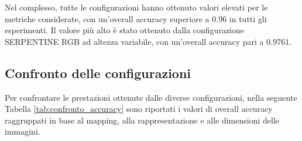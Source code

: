 \begin{table}[H]
    \centering
    \caption{Metriche delle configurazioni ad altezza variabile}
    \label{tab:metriche_variable}
    \renewcommand{\arraystretch}{1.3}
\end{table}

Nel complesso, tutte le configurazioni hanno ottenuto valori elevati
per le metriche considerate, con un'overall accuracy superiore a
0.96 in tutti gli esperimenti. Il valore più alto è stato ottenuto
dalla configurazione SERPENTINE RGB ad altezza variabile, con
un'overall accuracy pari a 0.9761.

\subsection{Confronto delle configurazioni}

Per confrontare le prestazioni ottenute dalle diverse configurazioni,
nella seguente Tabella \ref{tab:confronto_accuracy} sono riportati i
valori di overall accuracy raggruppati in base al mapping, alla
rappresentazione e alle dimensioni delle immagini.

